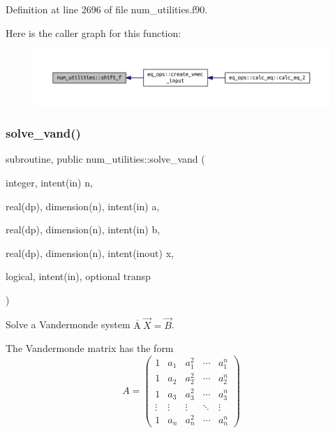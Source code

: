 Definition at line 2696 of file num\+\_\+utilities.\+f90.

Here is the caller graph for this function\+:\nopagebreak
\begin{figure}[H]
\begin{center}
\leavevmode
\includegraphics[width=350pt]{namespacenum__utilities_ac887f1cc7176167b352dedbd22ff2a57_icgraph}
\end{center}
\end{figure}
\mbox{\label{namespacenum__utilities_a54c65e345182e2e7e13ac14a0ba3647a}} 
\subsubsection{\texorpdfstring{solve\+\_\+vand()}{solve\_vand()}}
{\footnotesize\ttfamily subroutine, public num\+\_\+utilities\+::solve\+\_\+vand (\begin{DoxyParamCaption}\item[{integer, intent(in)}]{n,  }\item[{real(dp), dimension(n), intent(in)}]{a,  }\item[{real(dp), dimension(n), intent(in)}]{b,  }\item[{real(dp), dimension(n), intent(inout)}]{x,  }\item[{logical, intent(in), optional}]{transp }\end{DoxyParamCaption})}



Solve a Vandermonde system $\overline{\text{A}} \ \vec{X} = \vec{B}$. 

The Vandermonde matrix has the form \[A = \left(\begin{array}{ccccc} 1 & a_1 & a_1^2 & \cdots & a_1^n \\ 1 & a_2 & a_2^2 & \cdots & a_2^n \\ 1 & a_3 & a_3^2 & \cdots & a_3^n \\ \vdots & \vdots & \vdots & \ddots & \vdots \\ 1 & a_n & a_n^2 & \cdots & a_n^n \end{array}\right)\]

